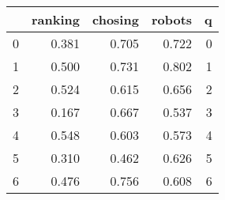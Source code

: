\begin{tabular}{lrrrr}
\toprule
{} &  ranking &  chosing &  robots &  q \\
\midrule
0 &    0.381 &    0.705 &   0.722 &  0 \\
1 &    0.500 &    0.731 &   0.802 &  1 \\
2 &    0.524 &    0.615 &   0.656 &  2 \\
3 &    0.167 &    0.667 &   0.537 &  3 \\
4 &    0.548 &    0.603 &   0.573 &  4 \\
5 &    0.310 &    0.462 &   0.626 &  5 \\
6 &    0.476 &    0.756 &   0.608 &  6 \\
\bottomrule
\end{tabular}
